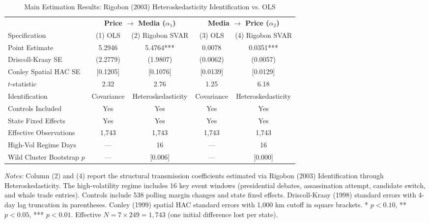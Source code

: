 \begin{table}[htbp]
\centering
\caption{Main Estimation Results: Rigobon (2003) Heteroskedasticity Identification vs. OLS}
\label{tab:main_results}
\small
\setlength{\tabcolsep}{4.5pt}
\begin{tabular}{lcccc}
\toprule
 & \multicolumn{2}{c}{\textbf{Price $\to$ Media ($\alpha_1$)}} & \multicolumn{2}{c}{\textbf{Media $\to$ Price ($\alpha_2$)}} \\
\cmidrule(lr){2-3} \cmidrule(lr){4-5}
Specification & (1) OLS & (2) Rigobon SVAR & (3) OLS & (4) Rigobon SVAR \\
\midrule
Point Estimate & 5.2946 & 5.4764*** & 0.0078 & 0.0351*** \\
Driscoll-Kraay SE & (2.2779) & (1.9807) & (0.0062) & (0.0057) \\
Conley Spatial HAC SE & [0.1205] & [0.1076] & [0.0139] & [0.0129] \\
$t$-statistic & 2.32 & 2.76 & 1.25 & 6.18 \\
\midrule
Identification & Covariance & Heteroskedasticity & Covariance & Heteroskedasticity \\
Controls Included & Yes & Yes & Yes & Yes \\
State Fixed Effects & Yes & Yes & Yes & Yes \\
Effective Observations & 1,743 & 1,743 & 1,743 & 1,743 \\
High-Vol Regime Days & --- & 16 & --- & 16 \\
Wild Cluster Bootstrap $p$ & --- & [0.006] & --- & [0.000] \\
\bottomrule
\end{tabular}
\begin{flushleft}
\footnotesize
\textit{Notes:} Column (2) and (4) report the structural transmission coefficients estimated via Rigobon (2003) Identification through Heteroskedasticity.
The high-volatility regime includes 16 key event windows (presidential debates, assassination attempt, candidate switch, and whale trade entries).
Controls include 538 polling margin changes and state fixed effects. Driscoll-Kraay (1998) standard errors with 4-day lag truncation in parentheses.
Conley (1999) spatial HAC standard errors with 1,000 km cutoff in square brackets.
* $p<0.10$, ** $p<0.05$, *** $p<0.01$. Effective $N = 7 \times 249 = 1,743$ (one initial difference lost per state).
\end{flushleft}
\end{table}
